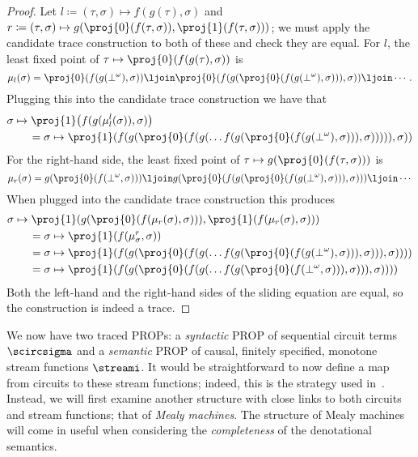 \documentclass{lmcs}
\begin{document}
\begin{proof}
    Let \(l \coloneqq (\tau, \sigma) \mapsto f(g(\tau), \sigma)\) and
    \(r \coloneqq (\tau, \sigma)
    \mapsto
    g(\proj{0}\mleft(f(\tau, \sigma)\mright),
    \proj{1}\mleft(f(\tau, \sigma)\mright))\); we must apply the candidate
    trace construction to both of these and check they are equal.
    For \(l\), the least fixed point of \(
    \tau \mapsto \proj{0}\mleft(f(g(\tau), \sigma)\mright)
    \) is \[
        \mu_l(\sigma) =
        \proj{0}\mleft(f(g(\bot^\omega), \sigma)\mright) \ljoin
        \proj{0}\mleft(f(g(\proj{0}\mleft(f(g(\bot^\omega), \sigma))\mright), \sigma)\mright) \ljoin
        \cdots.\]
    Plugging this into the candidate trace construction we have that \begin{align*}
         &
        \sigma \mapsto \proj{1}\mleft(f(g(\mu_l^l(\sigma)), \sigma)\mright)
        \\
         & \qquad=
        \sigma \mapsto \proj{1}\mleft(f(g(\proj{0}\mleft(f(g(\dots f(g(\proj{0}\mleft(f(g(\bot^\omega), \sigma)\mright)), \sigma)))\mright)), \sigma)\mright)
    \end{align*}
    For the right-hand side, the least fixed point of \(
    \tau \mapsto g(\proj{0}\mleft(f(\tau, \sigma)\mright))
    \) is \[
        \mu_r(\sigma) =
        g(\proj{0}\mleft(f(\bot^\omega, \sigma)\mright)) \ljoin
        g(\proj{0}\mleft(f(g(\proj{0}\mleft(f(g(\bot^\omega), \sigma)\mright)), \sigma)\mright)) \ljoin
        \cdots
    \]
    When plugged into the candidate trace construction this produces \begin{align*}
         & \sigma \mapsto \proj{1}\mleft(g(\proj{0}(f(\mu_r(\sigma), \sigma))), \proj{1}(f(\mu_r(\sigma), \sigma))\mright)
        \\
         & \qquad =
        \sigma \mapsto \proj{1}(f(\mu_\sigma^r, \sigma))
        \\
         & \qquad=
        \sigma \mapsto \proj{1}(f(
        g(\proj{0}\mleft(f(g(\dots f(g(\proj{0}\mleft(f(g(\bot^\omega), \sigma)\mright)), \sigma)\mright)), \sigma))))
        \\
         & \qquad=
        \sigma \mapsto \proj{1}(f(
        g(\proj{0}\mleft(f(g(\dots f(g(\proj{0}\mleft(f(\bot^\omega, \sigma)\mright)), \sigma)\mright)), \sigma))))
    \end{align*}
    Both the left-hand and the right-hand sides of the sliding equation are
    equal, so the construction is indeed a trace.
\end{proof}

We now have two traced PROPs: a \emph{syntactic} PROP of sequential circuit
terms \(\scircsigma\) and a \emph{semantic} PROP of causal, finitely
specified, monotone stream functions \(\streami\).
It would be straightforward to now define a map from circuits to these stream
functions; indeed, this is the strategy used in~\cite{ghica2024fully}.
Instead, we will first examine another structure with close links to both
circuits and stream functions; that of \emph{Mealy machines}.
The structure of Mealy machines will come in useful when considering the
\emph{completeness} of the denotational semantics.



\end{document}
